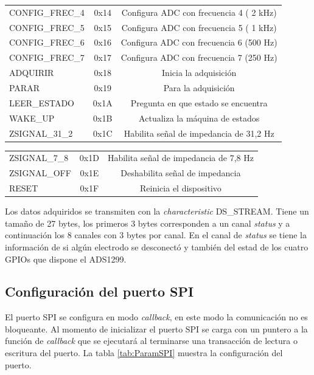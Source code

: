 \begin{table}[h]
\begin{tabular}{l c c}
CONFIG\_FREC\_4    &	0x14	&	Configura ADC con frecuencia 4 ( 2 kHz)\\
CONFIG\_FREC\_5    &	0x15	&	Configura ADC con frecuencia 5 ( 1 kHz)\\
CONFIG\_FREC\_6    &	0x16	&	Configura ADC con frecuencia 6 (500 Hz)\\
CONFIG\_FREC\_7	&	0x17	&	Configura ADC con frecuencia 7 (250 Hz)\\
ADQUIRIR			&	0x18	&	Inicia la adquisición\\
PARAR           	&	0x19	&	Para la adquisición\\
LEER\_ESTADO		&	0x1A	&	Pregunta en que estado se encuentra\\
WAKE\_UP       	&	0x1B	&	Actualiza la máquina de estados\\
ZSIGNAL\_31\_2	&	0x1C	&	Habilita señal de impedancia de 31,2 Hz\\
\end{tabular}
\label{tab:Comandos}
\end{table}

\begin{table}[h]
\centering
\begin{tabular}{l c c}

ZSIGNAL\_7\_8	&	0x1D	&	Habilita señal de impedancia de 7,8 Hz\\
ZSIGNAL\_OFF		&	0x1E	&	Deshabilita señal de impedancia\\
RESET			&	0x1F	&	Reinicia el dispositivo\\

\bottomrule
\hline
\end{tabular}
\end{table}

Los datos adquiridos se transmiten con la \textit{characteristic} DS\_STREAM. Tiene un tamaño de 27 bytes, los primeros 3 bytes corresponden a un canal \textit{status} y a continuación los 8 canales con 3 bytes por canal. En el canal de \textit{status} se tiene la información de si algún electrodo se desconectó y también del estad de los cuatro GPIOs que dispone el ADS1299.  

\subsection{Configuración del puerto SPI}
\label{configSPI}
El puerto SPI se configura en modo \textit{callback}, en este modo la comunicación no es bloqueante. Al momento de inicializar el puerto SPI se carga con un puntero a la función de \textit{callback} que se ejecutará al terminarse una transacción de lectura o escritura del puerto. La tabla \ref{tab:ParamSPI} muestra la configuración del puerto.

